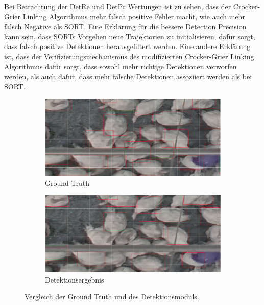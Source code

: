 Bei Betrachtung der DetRe und DetPr Wertungen ist zu sehen, dass der Crocker-Grier Linking Algorithmus mehr falsch positive Fehler macht, wie auch mehr falsch Negative als SORT. Eine Erklärung für die bessere Detection Precision kann sein, dass SORTs Vorgehen neue Trajektorien zu initialisieren, dafür sorgt, dass falsch positive Detektionen herausgefiltert werden. Eine andere Erklärung ist, dass der Verifizierungsmechanismus des modifizierten Crocker-Grier Linking Algorithmus dafür sorgt, dass sowohl mehr richtige Detektionen verworfen werden, als auch dafür, dass mehr falsche Detektionen assoziiert werden als bei SORT. \par

\begin{figure}
    \begin{center}
        \vspace*{-9mm}
        \begin{subfigure}[b]{0.5\textwidth}
             \centering
             \includegraphics[width=\textwidth]{img/Vergleich GT_Track GT.png}
             \caption{Ground Truth}
         \end{subfigure}
         \hfill
         \begin{subfigure}[b]{0.5\textwidth}
             \centering         
             \includegraphics[width=\textwidth]{img/Vergleich GT_Track Tracking.png}
             \caption{Detektionsergebnis}
         \end{subfigure}
        \vspace*{-10mm}
        \caption{Vergleich der Ground Truth und des Detektionsmoduls.}
        \label{fig:GTvsDetsComp}
    \end{center}
\end{figure}
